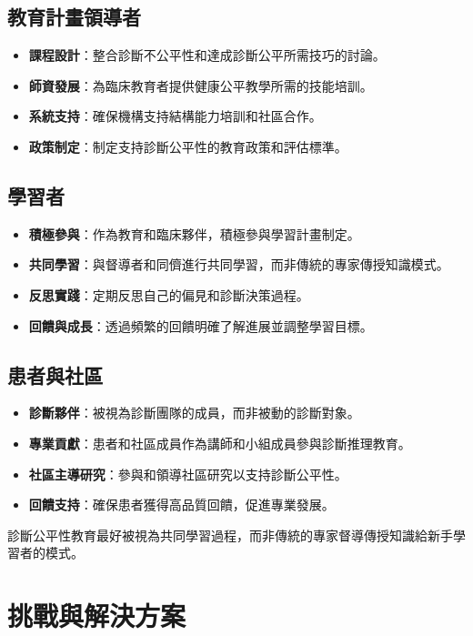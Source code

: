\documentclass[12pt,a4paper]{article}
\newcommand{\note}[1]{
    \par
    \noindent
    \begin{tcolorbox}[
        colback=emergency_blue!5!white,
        colframe=emergency_blue,
        title=\textbf{重點提醒},
        fonttitle=\bfseries,
        boxrule=0.5pt,
        arc=3pt,
        left=6pt,
        right=6pt,
        top=6pt,
        bottom=6pt
    ]
    #1
    \end{tcolorbox}
}
\begin{document}
\subsection{教育計畫領導者}
\begin{itemize}[nosep]
    \item \textbf{課程設計}：整合診斷不公平性和達成診斷公平所需技巧的討論。
    \item \textbf{師資發展}：為臨床教育者提供健康公平教學所需的技能培訓。
    \item \textbf{系統支持}：確保機構支持結構能力培訓和社區合作。
    \item \textbf{政策制定}：制定支持診斷公平性的教育政策和評估標準。
\end{itemize}

\subsection{學習者}
\begin{itemize}[nosep]
    \item \textbf{積極參與}：作為教育和臨床夥伴，積極參與學習計畫制定。
    \item \textbf{共同學習}：與督導者和同儕進行共同學習，而非傳統的專家傳授知識模式。
    \item \textbf{反思實踐}：定期反思自己的偏見和診斷決策過程。
    \item \textbf{回饋與成長}：透過頻繁的回饋明確了解進展並調整學習目標。
\end{itemize}

\subsection{患者與社區}
\begin{itemize}[nosep]
    \item \textbf{診斷夥伴}：被視為診斷團隊的成員，而非被動的診斷對象。
    \item \textbf{專業貢獻}：患者和社區成員作為講師和小組成員參與診斷推理教育。
    \item \textbf{社區主導研究}：參與和領導社區研究以支持診斷公平性。
    \item \textbf{回饋支持}：確保患者獲得高品質回饋，促進專業發展。
\end{itemize}

\vspace{0.5cm}
\note{
診斷公平性教育最好被視為共同學習過程，而非傳統的專家督導傳授知識給新手學習者的模式。
}

\section{挑戰與解決方案}
\end{document}
